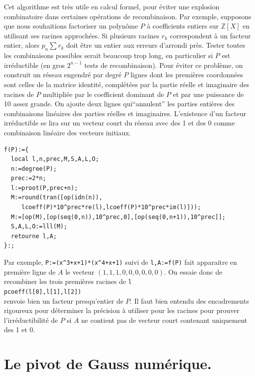 \documentclass[a4paper,11pt]{book}
\begin{document}
\begin{giacjshere}
Cet algorithme est tr\`es utile en calcul formel, pour \'eviter
une explosion combinatoire dans certaines
op\'erations de recombinaison. Par exemple, supposons que
nous souhaitions factoriser un polyn\^ome $P$ \`a coefficients
entiers sur $\mathbb{Z}[X]$ en utilisant ses racines approch\'ees. Si
plusieurs racines $r_k$ correspondent \`a un facteur entier,
alors $p_n \sum r_k $ doit \^etre un entier aux erreurs
d'arrondi pr\`es. Tester toutes les combinaisons possibles
serait beaucoup trop long, en particulier si $P$ est irr\'eductible
(en gros $2^{n-1}$ tests de recombinaison). Pour \'eviter ce
probl\`eme, on construit un r\'eseau engendr\'e par degr\'e $P$ 
lignes dont les premi\`eres coordonn\'ees sont celles de la
matrice identit\'e, compl\'et\'ees par la partie r\'eelle et
imaginaire des racines de $P$ multipli\'ee par le coefficient dominant
de $P$ et par une puissance de 10 assez grande. On ajoute
deux lignes qui``annulent'' les parties enti\`eres des combinaisons
lin\'eaires des parties r\'eelles et imaginaires.
L'existence
d'un facteur irr\'eductible se lira sur un vecteur court du r\'eseau
avec des 1 et des 0 comme combinaison lin\'eaire des vecteurs
initiaux.
\begin{verbatim}
f(P):={
  local l,n,prec,M,S,A,L,O;
  n:=degree(P);
  prec:=2*n;
  l:=proot(P,prec+n);
  M:=round(tran([op(idn(n)),
     lcoeff(P)*10^prec*re(l),lcoeff(P)*10^prec*im(l)]));
  M:=[op(M),[op(seq(0,n)),10^prec,0],[op(seq(0,n+1)),10^prec]];
  S,A,L,O:=lll(M);
  retourne l,A;
}:;
\end{verbatim}
Par exemple, \verb|P:=(x^3+x+1)*(x^4+x+1)| suivi de \verb|l,A:=f(P)|
fait apparaitre en premi\`ere ligne de $A$ le vecteur
$(1,1,1,0,0,0,0,0,0)$. On essaie donc de recombiner les trois
premi\`eres racines de \verb|l|\\
\verb|pcoeff(l[0],l[1],l[2])|\\
renvoie bien un facteur presqu'entier de $P$. Il faut bien entendu des
encadrements rigoureux pour d\'eterminer la pr\'ecision \`a utiliser
pour les racines pour prouver l'irr\'eductibilit\'e de $P$ si $A$ ne
contient pas de vecteur court contenant uniquement des 1 et 0.

\section{Le pivot de Gauss num\'erique.}

\end{giacjshere}
\end{document}
